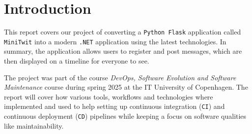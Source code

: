 \section{Introduction}
\label{ch:introduction}

This report covers our project of converting a \texttt{Python Flask} application called \texttt{MiniTwit}
into a modern \texttt{.NET} application using the latest technologies. In summary, the application allows users to register and post messages,  which are then displayed on a timeline for everyone to see.

The project was part of the course \textit{DevOps, Software Evolution and Software Maintenance} course during spring 2025 at the 
IT University of Copenhagen. The report will cover how various tools, workflows and technologies where implemented and used to help setting up continuous integration (\texttt{CI}) 
and continuous deployment (\texttt{CD}) pipelines while keeping a focus on software qualities like maintainability.
